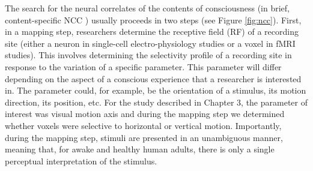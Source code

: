 The search for the neural correlates of the contents of consciousness (in brief, content-specific NCC \cite{Koch2016}) usually proceeds in two steps (see Figure \ref{fig:ncc}). First, in a mapping step, researchers determine the receptive field (RF) of a recording site (either a neuron in single-cell electro-physiology studies or a voxel in fMRI studies). This involves determining the selectivity profile of a recording site in response to the variation of a specific parameter. This parameter will differ depending on the aspect of a conscious experience that a researcher is interested in. The parameter could, for example, be the orientation of a stimulus, its motion direction, its position, etc. For the study described in Chapter 3, the parameter of interest was visual motion axis and during the mapping step we determined whether voxels were selective to horizontal or vertical motion. Importantly, during the mapping step, stimuli are presented in an unambiguous manner, meaning that, for awake and healthy human adults, there is only a single perceptual interpretation of the stimulus.

